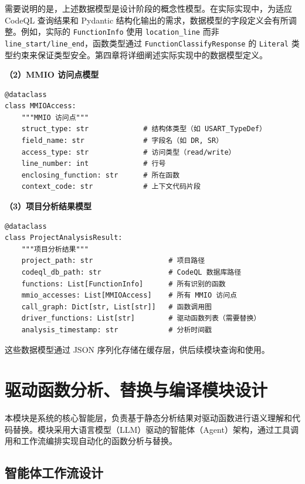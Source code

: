 需要说明的是，上述数据模型是设计阶段的概念性模型。在实际实现中，为适应 CodeQL 查询结果和 Pydantic 结构化输出的需求，数据模型的字段定义会有所调整。例如，实际的 \texttt{FunctionInfo} 使用 \texttt{location\_line} 而非 \texttt{line\_start/line\_end}，函数类型通过 \texttt{FunctionClassifyResponse} 的 \texttt{Literal} 类型约束来保证类型安全。第四章将详细阐述实际实现中的数据模型定义。

\textbf{（2）MMIO 访问点模型}

\begin{lstlisting}[style=CStyle,abovecaptionskip=0pt,belowcaptionskip=0pt]
@dataclass
class MMIOAccess:
    """MMIO 访问点"""
    struct_type: str             # 结构体类型（如 USART_TypeDef）
    field_name: str              # 字段名（如 DR, SR）
    access_type: str             # 访问类型（read/write）
    line_number: int             # 行号
    enclosing_function: str      # 所在函数
    context_code: str            # 上下文代码片段
\end{lstlisting}

\textbf{（3）项目分析结果模型}

\begin{lstlisting}[style=CStyle,abovecaptionskip=0pt,belowcaptionskip=0pt]
@dataclass
class ProjectAnalysisResult:
    """项目分析结果"""
    project_path: str                  # 项目路径
    codeql_db_path: str                # CodeQL 数据库路径
    functions: List[FunctionInfo]      # 所有识别的函数
    mmio_accesses: List[MMIOAccess]    # 所有 MMIO 访问点
    call_graph: Dict[str, List[str]]   # 函数调用图
    driver_functions: List[str]        # 驱动函数列表（需要替换）
    analysis_timestamp: str            # 分析时间戳
\end{lstlisting}

这些数据模型通过 JSON 序列化存储在缓存层，供后续模块查询和使用。

\section{驱动函数分析、替换与编译模块设计}
\label{sec:builder}

本模块是系统的核心智能层，负责基于静态分析结果对驱动函数进行语义理解和代码替换。模块采用大语言模型（LLM）驱动的智能体（Agent）架构，通过工具调用和工作流编排实现自动化的函数分析与替换。

\subsection{智能体工作流设计}


